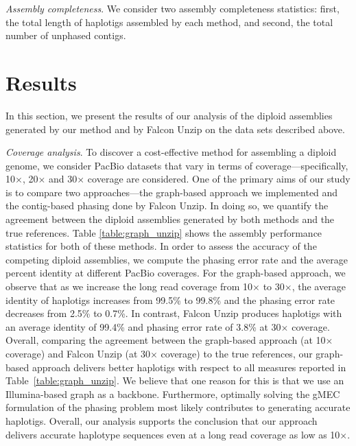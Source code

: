 \textit{Assembly completeness}. We consider two assembly completeness statistics: first, the total length of haplotigs assembled by each method, and second, the total number of unphased contigs.

\section{Results}
In this section, we present the results of our analysis of the diploid assemblies generated by our method and by Falcon Unzip on the data sets described above.

\textit{Coverage analysis}. To discover a cost-effective method for assembling a diploid genome, we consider PacBio datasets that vary in terms of coverage---specifically, 10$\times$, 20$\times$ and 30$\times$ coverage are considered.
One of the primary aims of our study is to compare two approaches---the graph-based approach we implemented and the contig-based phasing done by Falcon Unzip. In doing so, we quantify the agreement between the diploid assemblies generated by both methods and the true references.
Table \ref{table:graph_unzip} shows the assembly performance statistics for both of these methods.
In order to assess the accuracy of the competing diploid assemblies, we compute the phasing error rate and the average percent identity at different PacBio coverages.
For the graph-based approach, we observe that as we increase the long read coverage from 10$\times$ to 30$\times$, the average identity of haplotigs increases from 99.5\% to 99.8\% and 
the phasing error rate decreases from 2.5\% to 0.7\%. In contrast, Falcon Unzip produces haplotigs with an average identity of 99.4\% and phasing error rate of 3.8\% at 30$\times$ coverage. 
Overall, comparing the agreement between the graph-based approach (at 10$\times$ coverage) and Falcon Unzip (at 30$\times$ coverage) to the true references, our graph-based approach delivers better haplotigs with respect to all measures reported in Table~\ref{table:graph_unzip}.
We believe that one reason for this is that we use an Illumina-based graph as a backbone.
Furthermore, optimally solving the gMEC formulation of the phasing problem most likely contributes to generating accurate haplotigs.
Overall, our analysis supports the conclusion that our approach delivers accurate haplotype sequences even at a long read coverage as low as 10$\times$.


